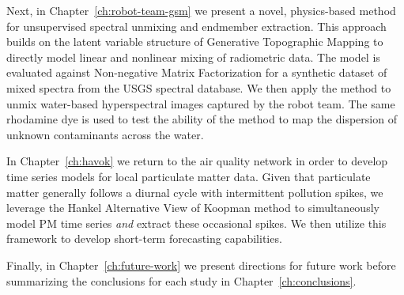 Next, in Chapter~\ref{ch:robot-team-gsm} we present a novel, physics-based
method for unsupervised spectral unmixing and endmember extraction.
This approach builds on the latent variable structure of Generative Topographic
Mapping to directly model linear and nonlinear mixing of radiometric data.
The model is evaluated against Non-negative Matrix Factorization for a
synthetic dataset of mixed spectra from the USGS spectral database. We then
apply the method to unmix water-based hyperspectral images captured by the robot
team. The same rhodamine dye is used to test the ability of the method to map
the dispersion of unknown contaminants across the water.

In Chapter~\ref{ch:havok} we return to the air quality network in order to develop time
series models for local particulate matter data. Given that particulate matter
generally follows a diurnal cycle with intermittent pollution spikes, we
leverage the Hankel Alternative View of Koopman method to simultaneously model
PM time series \textit{and} extract these occasional spikes. We then utilize
this framework to develop short-term forecasting capabilities.

Finally, in Chapter~\ref{ch:future-work} we present directions for future work
before summarizing the conclusions for each study in
Chapter~\ref{ch:conclusions}.














